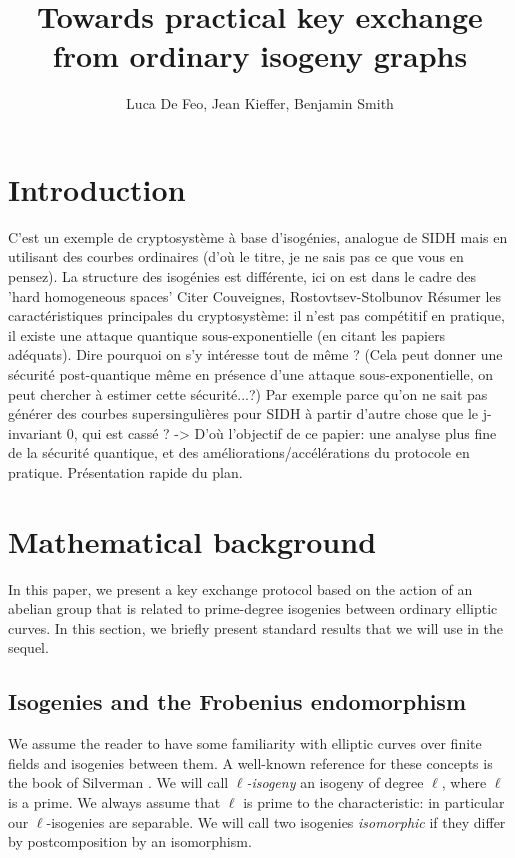 \documentclass{article}
\title{Towards practical key exchange from ordinary isogeny graphs}
\author{Luca De Feo, Jean Kieffer, Benjamin Smith}
\theoremstyle{definition}
\begin{document}
\maketitle

\begin{abstract}
  
\end{abstract}

\section{Introduction}

C'est un exemple de cryptosystème à base d'isogénies, analogue de SIDH
mais en utilisant des courbes ordinaires (d'où le titre, je ne sais
pas ce que vous en pensez).  La structure des isogénies est
différente, ici on est dans le cadre des 'hard homogeneous spaces'
Citer Couveignes, Rostovtsev-Stolbunov Résumer les caractéristiques
principales du cryptosystème: il n'est pas compétitif en pratique, il
existe une attaque quantique sous-exponentielle (en citant les papiers
adéquats).  Dire pourquoi on s'y intéresse tout de même ? (Cela peut
donner une sécurité post-quantique même en présence d'une attaque
sous-exponentielle, on peut chercher à estimer cette sécurité...?) Par
exemple parce qu'on ne sait pas générer des courbes supersingulières
pour SIDH à partir d'autre chose que le j-invariant 0, qui est cassé ?
-> D'où l'objectif de ce papier: une analyse plus fine de la sécurité
quantique, et des améliorations/accélérations du protocole en
pratique.  Présentation rapide du plan.

\section{Mathematical background}
\label{sec:math}

In this paper, we present a key exchange protocol based on the action of
an abelian group that is related to prime-degree isogenies between ordinary
elliptic curves. In this section, we briefly present standard results that
we will use in the sequel.

\subsection{Isogenies and the Frobenius endomorphism}


We assume the reader to have some familiarity with elliptic curves over 
finite fields and isogenies between them. A well-known reference for these 
concepts is the book of Silverman \cite{Sil1}. We will call 
\emph{$\ell$-isogeny} an isogeny of degree $\ell$, where $\ell$ is a prime.
We always assume that $\ell$ is prime to the characteristic:
in particular our $\ell$-isogenies are separable. We will call two isogenies
\emph{isomorphic} if they differ by postcomposition by an isomorphism.
\end{document}
